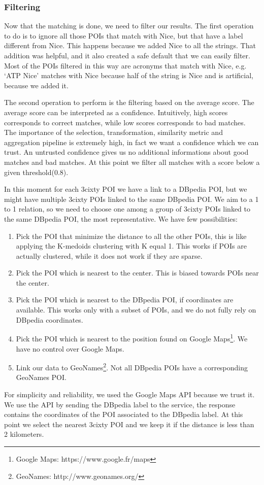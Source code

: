 \documentclass[paper=a4, fontsize=11pt]{scrartcl}
\begin{document}
\subsubsection{Filtering}
Now that the matching is done, we need to filter our results.
The first operation to do is to ignore all those POIs that match with Nice, but that have a label different from Nice. This happens because we added Nice to all the strings. That addition was helpful, and it also created a safe default that we can easily filter.
Most of the POIs filtered in this way are acronyms that match with Nice, e.g. `ATP Nice' matches with Nice because half of the string is Nice and is artificial, because we added it.

The second operation to perform is the filtering based on the average score.
The average score can be interpreted as a confidence. Intuitively, high scores corresponds to correct matches, while low scores corresponds to bad matches.
The importance of the selection, transformation, similarity metric and aggregation pipeline is extremely high, in fact we want a confidence which we can trust. An untrusted confidence gives us no additional informations about good matches and bad matches.
At this point we filter all matches with a score below a given threshold(0.8).

In this moment for each 3cixty POI we have a link to a DBpedia POI, but we might have multiple 3cixty POIs linked to the same DBpedia POI. We aim to a 1 to 1 relation, so we need to choose one among a group of 3cixty POIs linked to the same DBpedia POI, the most representative.
We have few possibilities:
\begin{enumerate}
\item Pick the POI that minimize the distance to all the other POIs, this is like applying the K-medoids clustering with K equal 1. This works if POIs are actually clustered, while it does not work if they are sparse.
\item Pick the POI which is nearest to the center. This is biased towards POIs near the center.
\item Pick the POI which is nearest to the DBpedia POI, if coordinates are available. This works only with a subset of POIs, and we do not fully rely on DBpedia coordinates.
\item Pick the POI which is nearest to the position found on Google Maps\footnote{Google Maps: https://www.google.fr/maps}. We have no control over Google Maps.
\item Link our data to GeoNames\footnote{GeoNames: http://www.geonames.org/}. Not all DBpedia POIs have a corresponding GeoNames POI.
\end{enumerate}
For simplicity and reliability, we used the Google Maps API because we trust it.
We use the API by sending the DBpedia label to the service, the response contains the coordinates of the POI associated to the DBpedia label. At this point we select the nearest 3cixty POI and we keep it if the distance is less than 2 kilometers.
\end{document}
